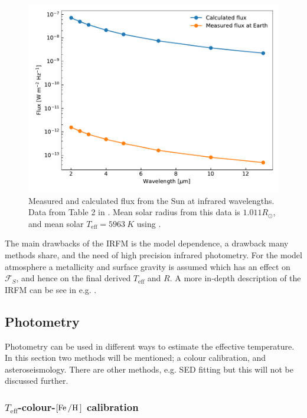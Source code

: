 \begin{figure}[htpb!]
    \centering
    \includegraphics[width=0.85\linewidth]{figures/IRFM.pdf}
    \caption{Measured and calculated flux from the Sun at infrared wavelengths.
             Data from Table 2 in \citet{Blackwell1977}. Mean solar radius from
             this data is $1.011R_\odot$, and mean solar
             $T_\mathrm{eff}=\SI{5963}{K}$ using .}
    \label{fig:IRFM}
\end{figure}

The main drawbacks of the IRFM is the model dependence, a drawback many methods
share, and the need of high precision infrared photometry. For the model
atmosphere a metallicity and surface gravity is assumed which has an effect on
$\mathcal{F}_S$, and hence on the final derived $T_\mathrm{eff}$ and $R$. A more
in-depth description of the IRFM can be see in e.g.
\citet[][section 4]{Casagrande2006}.



\subsection{Photometry}

Photometry can be used in different ways to estimate the effective temperature.
In this section two methods will be mentioned; a colour calibration, and
asteroseismology. There are other methods, e.g. SED fitting but this will not
be discussed further.

\subsubsection{$T_\mathrm{eff}$-colour-$[\ion{Fe}/\ion{H}]$ calibration}

